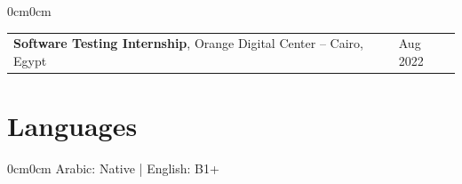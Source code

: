 \documentclass[10pt, letterpaper]{article}
\newenvironment{onecolentry}{\begin{adjustwidth}{0cm}{0cm}}{\end{adjustwidth}}
\begin{document}
\begin{adjustwidth}{0cm}{0cm}
\begin{tabularx}{\textwidth}{@{} >{\raggedright\arraybackslash}X >{\raggedleft\arraybackslash}p{4.5cm} @{}}
\textbf{Software Testing Internship}, Orange Digital Center – Cairo, Egypt & Aug 2022 \\
\end{tabularx}
\end{adjustwidth}


\section{Languages}
\begin{onecolentry}
Arabic: Native \quad | \quad English: B1+ 
\end{onecolentry}
\end{document}
